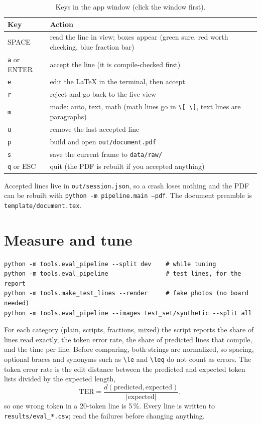 \documentclass[11pt]{article}
\newcommand{\cmd}[1]{\texttt{#1}}
\begin{document}
\begin{table}[H]
\centering
\begin{tabular}{C{2.6cm}C{8.8cm}}
\toprule
\textbf{Key} & \textbf{Action} \\
\midrule
SPACE & read the line in view; boxes appear (green sure, red worth checking, blue fraction bar) \\
\cmd{a} or ENTER & accept the line (it is compile-checked first) \\
\cmd{e} & edit the \LaTeX{} in the terminal, then accept \\
\cmd{r} & reject and go back to the live view \\
\cmd{m} & mode: auto, text, math (math lines go in \verb|\[ \]|, text lines are paragraphs) \\
\cmd{u} & remove the last accepted line \\
\cmd{p} & build and open \cmd{out/document.pdf} \\
\cmd{s} & save the current frame to \cmd{data/raw/} \\
\cmd{q} or ESC & quit (the PDF is rebuilt if you accepted anything) \\
\bottomrule
\end{tabular}
\caption{Keys in the app window (click the window first).}
\end{table}

Accepted lines live in \cmd{out/session.json}, so a crash loses nothing and the PDF can be rebuilt
with \cmd{python -m pipeline.main --pdf}. The document preamble is \cmd{template/document.tex}.

\section{Measure and tune}

\begin{lstlisting}
python -m tools.eval_pipeline --split dev    # while tuning
python -m tools.eval_pipeline                # test lines, for the report
python -m tools.make_test_lines --render     # fake photos (no board needed)
python -m tools.eval_pipeline --images test_set/synthetic --split all
\end{lstlisting}

For each category (plain, scripts, fractions, mixed) the script reports the share of lines read
exactly, the token error rate, the share of predicted lines that compile, and the time per line.
Before comparing, both strings are normalized, so spacing, optional braces and synonyms such as
\verb|\le| and \verb|\leq| do not count as errors. The token error rate is the edit distance
between the predicted and expected token lists divided by the expected length,
\[
  \mathrm{TER} = \frac{d(\text{predicted}, \text{expected})}{|\text{expected}|},
\]
so one wrong token in a 20-token line is 5\,\%. Every line is written to
\cmd{results/eval\_*.csv}; read the failures before changing anything.
\end{document}
